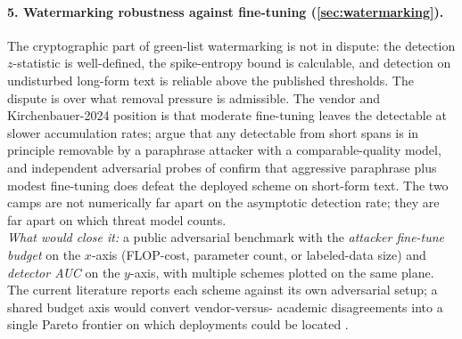 \paragraph{5. Watermarking robustness against fine-tuning (\cref{sec:watermarking}).}
The cryptographic part of green-list watermarking
\citep{kirchenbauer2023-watermark} is not in dispute: the
detection $z$-statistic is well-defined, the spike-entropy bound
is calculable, and detection on undisturbed long-form text is
reliable above the published thresholds. The dispute is over what
removal pressure is admissible. The vendor and Kirchenbauer-2024
position is that moderate fine-tuning leaves the 
detectable at slower accumulation rates; \citet{sadasivan2023-detection}%
argue that any  detectable from short spans is in
principle removable by a paraphrase attacker with a
comparable-quality model, and independent adversarial probes of
 confirm that aggressive paraphrase plus modest
fine-tuning does defeat the deployed scheme on short-form text.
The two camps are not numerically far apart on the asymptotic
detection rate; they are far apart on which threat model
counts.\\
\emph{What would close it:} a public adversarial benchmark with
the \emph{attacker fine-tune budget} on the $x$-axis (FLOP-cost,
parameter count, or labeled-data size) and \emph{detector AUC} on
the $y$-axis, with multiple  schemes plotted on the same
plane. The current literature reports each scheme against its own
adversarial setup; a shared budget axis would convert vendor-versus-
academic disagreements into a single Pareto frontier on which
deployments could be located \citep{kirchenbauer2023-watermark,
sadasivan2023-detection}.

